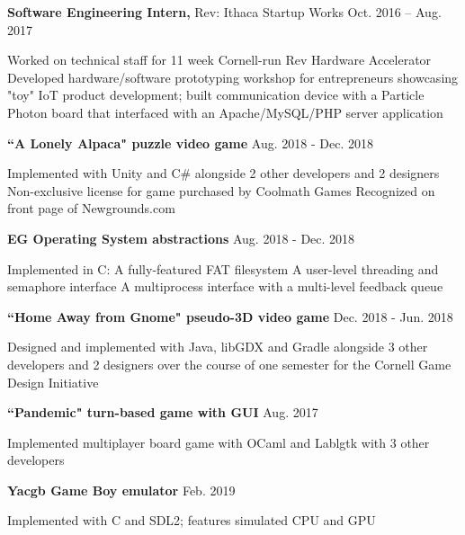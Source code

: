 \documentclass[letterpaper,MMMyyyy,nonstopmode]{simpleresumecv}
\begin{document}
\begin{Body}
\Gap

\Entry
\textbf{Software Engineering Intern,} Rev: Ithaca Startup Works
\hfill
Oct. 2016 -- Aug. 2017
\Gap
\begin{Detail}
\BulletItem
Worked on technical staff for 11 week Cornell-run Rev Hardware Accelerator
\BulletItem
Developed hardware/software prototyping workshop for entrepreneurs showcasing \newline "toy" IoT product development; built communication device with a Particle Photon \newline board that interfaced with an Apache/MySQL/PHP server application
\end{Detail}

\BulletItem
\textbf{``A Lonely Alpaca" puzzle video game}
\hfill
Aug. 2018 - Dec. 2018
\begin{Detail}
\Item
Implemented with Unity and C\# alongside 2 other developers and 2 designers
\SubBulletItem Non-exclusive license for game purchased by Coolmath Games
\SubBulletItem Recognized on front page of Newgrounds.com
\end{Detail}


\Gap
\BulletItem
\textbf{EG Operating System abstractions}
\hfill
Aug. 2018 - Dec. 2018
\begin{Detail}
\Item
Implemented in C:
\SubBulletItem A fully-featured FAT filesystem
\SubBulletItem A user-level threading and semaphore interface
\SubBulletItem A multiprocess interface with a multi-level feedback queue
\end{Detail}

\Gap

\BulletItem
\textbf{``Home Away from Gnome" pseudo-3D video game}
\hfill
Dec. 2018 - Jun. 2018
\begin{Detail}
\Item
Designed and implemented with Java, libGDX and Gradle alongside 3 other developers \newline and 2 designers over the course of one semester for the Cornell Game Design Initiative
\end{Detail}

\Gap
\BulletItem
\textbf{``Pandemic" turn-based game with GUI}
\hfill
Aug. 2017
\begin{Detail}
\Item
Implemented multiplayer board game with OCaml and Lablgtk with 3 other developers
\end{Detail}

\Gap
\BulletItem
\textbf{Yacgb Game Boy emulator}
\hfill
Feb. 2019
\begin{Detail}
\Item
Implemented with C and SDL2; features simulated CPU and GPU
\end{Detail}



\end{Body}
\end{document}
